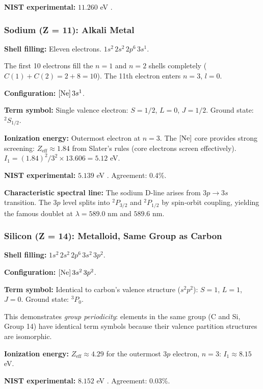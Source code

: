 \documentclass[11pt,twocolumn,a4paper]{article}
\theoremstyle{definition}
\theoremstyle{remark}
\begin{document}
\textbf{NIST experimental:} $11.260$ eV \citep{nist_asd}.

\subsubsection{Sodium (Z = 11): Alkali Metal}

\textbf{Shell filling:} Eleven electrons. $1s^2\,2s^2\,2p^6\,3s^1$.

The first 10 electrons fill the $n = 1$ and $n = 2$ shells completely ($C(1) + C(2) = 2 + 8 = 10$). The 11th electron enters $n = 3$, $l = 0$.

\textbf{Configuration:} $[{\rm Ne}]\,3s^1$.

\textbf{Term symbol:} Single valence electron: $S = 1/2$, $L = 0$, $J = 1/2$. Ground state: ${}^2S_{1/2}$.

\textbf{Ionization energy:} Outermost electron at $n = 3$. The $[{\rm Ne}]$ core provides strong screening: $Z_{\mathrm{eff}} \approx 1.84$ from Slater's rules (core electrons screen effectively). $I_1 = (1.84)^2/3^2 \times 13.606 = 5.12$ eV.

\textbf{NIST experimental:} $5.139$ eV \citep{nist_asd}. Agreement: 0.4\%.

\textbf{Characteristic spectral line:} The sodium D-line arises from $3p \to 3s$ transition. The $3p$ level splits into ${}^2P_{3/2}$ and ${}^2P_{1/2}$ by spin-orbit coupling, yielding the famous doublet at $\lambda = 589.0$ nm and $589.6$ nm.

\subsubsection{Silicon (Z = 14): Metalloid, Same Group as Carbon}

\textbf{Shell filling:} $1s^2\,2s^2\,2p^6\,3s^2\,3p^2$.

\textbf{Configuration:} $[{\rm Ne}]\,3s^2\,3p^2$.

\textbf{Term symbol:} Identical to carbon's valence structure ($s^2 p^2$): $S = 1$, $L = 1$, $J = 0$. Ground state: ${}^3P_0$.

This demonstrates \emph{group periodicity}: elements in the same group (C and Si, Group 14) have identical term symbols because their valence partition structures are isomorphic.

\textbf{Ionization energy:} $Z_{\mathrm{eff}} \approx 4.29$ for the outermost $3p$ electron, $n = 3$: $I_1 \approx 8.15$ eV.

\textbf{NIST experimental:} $8.152$ eV \citep{nist_asd}. Agreement: 0.03\%.
\end{document}
